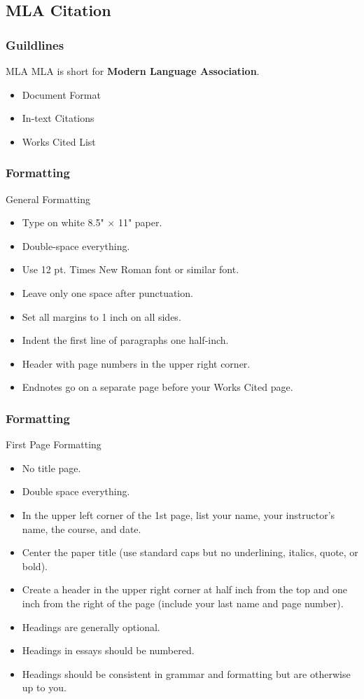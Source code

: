 \documentclass{beamer}
\begin{document}
\subsection{MLA Citation}
\begin{frame}
\frametitle{Guildlines}
\begin{block}{MLA}
MLA is short for \textbf{Modern Language Association}.
\begin{itemize}
\item Document Format
\item In-text Citations
\item Works Cited List
\end{itemize}
\end{block}
\end{frame}
\begin{frame}
\frametitle{Formatting}
\begin{block}{General Formatting}
\begin{itemize}
\item Type on white 8.5" $\times$ 11" paper.
\item Double-space everything.
\item Use 12 pt. Times New Roman font or similar font.
\item Leave only one space after punctuation.
\item Set all margins to 1 inch on all sides.
\item Indent the first line of paragraphs one half-inch.
\item Header with page numbers in the upper right corner.
\item Endnotes go on a separate page before your Works Cited page.
\end{itemize}
\end{block}
\end{frame}
\begin{frame}
\frametitle{Formatting}
\begin{block}{First Page Formatting}
\begin{itemize}
\item No title page.
\item Double space everything.
\item In the upper left corner of the 1st page, list your name, your instructor's name, the course, and date.
\item Center the paper title (use standard caps but no underlining, italics, quote, or bold).
\item Create a header in the upper right corner at half inch from the top and one inch from the right of the page (include your last name and page number).
\item Headings are generally optional.
\item Headings in essays should be numbered.
\item Headings should be consistent in grammar and formatting but are otherwise up to you.
\end{itemize}
\end{block}
\end{frame}
\end{document}
